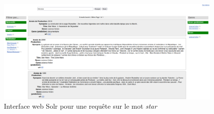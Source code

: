 \begin{figure}
    \center
    \includegraphics[scale=.25]{img/solr.png}
    \caption{Interface web Solr pour une requête sur le mot \textit{star}}
    \label{solr}
\end{figure}

